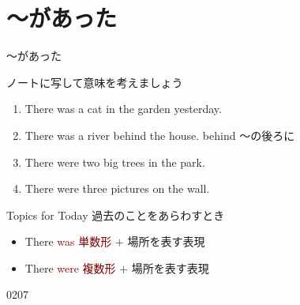 \documentclass[aspectratio=169,xcolor={dvipsnames,table}]{beamer}
\newcommand{\myaudio}[1]{\href{#1}{\faVolumeUp}}
\begin{document}
\section{～があった}
\begin{frame}[plain]{〜があった}

ノートに写して意味を考えましょう
\begin{enumerate}
 \item There was a cat in the garden yesterday.
 \item There was a river behind the house.%
\hfill{\scriptsize behind ～の後ろに }
 \item There were two big trees in the park.
 \item There were three pictures on the wall.
\end{enumerate}

\begin{block}{Topics for Today}
過去のことをあらわすとき
\begin{itemize}[square]
 \item There \textcolor{Maroon}{was 単数形} $+$ 場所を表す表現
 \item There \textcolor{Maroon}{were 複数形} $+$ 場所を表す表現
\end{itemize}
\end{block}

\hfill{\tiny 0207}\,{\scriptsize \myaudio{./audio/001_there_is_04.mp3}}
\end{frame}
\end{document}
